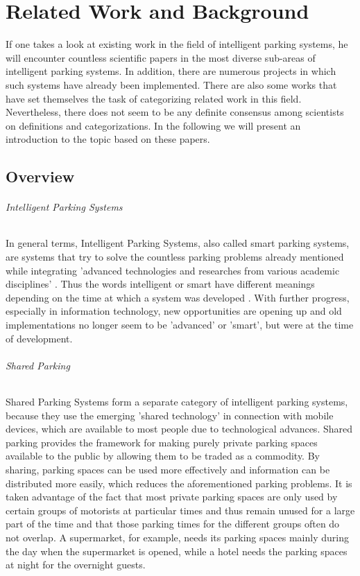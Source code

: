\chapter{Related Work and Background}
\label{ch:Related Work and Background}
If one takes a look at existing work in the field of intelligent parking systems, he will encounter countless scientific papers in the most diverse sub-areas of intelligent parking systems. In addition, there are numerous projects in which such systems have already been implemented. There are also some works that have set themselves the task of categorizing related work in this field. Nevertheless, there does not seem to be any definite consensus among scientists on definitions and categorizations. In the following we will present an introduction to the topic based on these papers.

\section{Overview}

\subparagraph{Intelligent Parking Systems}
In general terms, Intelligent Parking Systems, also called smart parking systems, are systems that try to solve the countless parking problems already mentioned while integrating 'advanced technologies and researches from various academic disciplines' \cite{idris2009car}. Thus the words intelligent or smart have different meanings depending on the time at which a system was developed \cite{fraifer2016investigation}. With further progress, especially in information technology, new opportunities are opening up and old implementations no longer seem to be 'advanced' or 'smart', but were at the time of development.
\subparagraph{Shared Parking}
Shared Parking Systems form a separate category of intelligent parking systems, because they use the emerging 'shared technology' in connection with mobile devices, which are available to most people due to technological advances. Shared parking provides the framework for making purely private parking spaces available to the public by allowing them to be traded as a commodity. \cite{itdp2014shared} By sharing, parking spaces can be used more effectively and information can be distributed more easily, which reduces the aforementioned parking problems. It is taken advantage of the fact that most private parking spaces are only used by certain groups of motorists at particular times and thus remain unused for a large part of the time and that those parking times for the different groups often do not overlap.\cite{vtpi2015shared} A supermarket, for example, needs its parking spaces mainly during the day when the supermarket is opened, while a hotel needs the parking spaces at night for the overnight guests.\\
